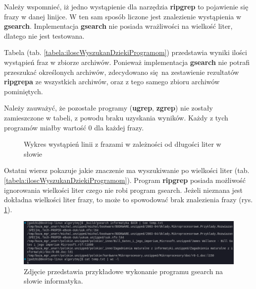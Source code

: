 Należy wspomnieć, iż jedno wystąpienie dla narzędzia \textbf{ripgrep} to pojawienie się frazy
w danej linijce. W ten sam sposób liczone jest znalezienie wystąpienia w \textbf{gsearch}.
Implementacja \textbf{gsearch} nie posiada wrażliwości na wielkość liter, dlatego nie 
jest testowana.

Tabela (tab. \ref{tabela:iloscWyszukanDziekiProgramom}) przedstawia wyniki ilości 
wystąpień fraz w zbiorze archiwów. Ponieważ implementacja \textbf{gsearch} nie potrafi
przeszukać określonych archiwów, zdecydowano się na zestawienie rezultatów
\textbf{ripgrepa} ze wszystkich archiwów, oraz z tego samego zbioru archiwów pominiętych. 

Należy zauważyć, że pozostałe programy (\textbf{ugrep}, \textbf{zgrep}) nie 
zostały zamieszczone w tabeli, z powodu braku uzyskania wyników.
Każdy z tych programów miałby wartość 0 dla każdej frazy.

\begin{figure}[htbp]
    \centering
    \caption{Wykres wystąpień linii z frazami w zależności od długości liter w słowie }
    \label{fig:wykresPorównaniaIlosciWystapień}
\end{figure}

Ostatni wiersz pokazuje jakie znaczenie ma wyszukiwanie po wielkości liter 
(tab. \ref{tabela:iloscWyszukanDziekiProgramom}). Program \textbf{ripgrep} posiada 
możliwość ignorowania wielkości liter czego nie robi program gsearch. Jeżeli
nieznana jest dokładna wielkości liter frazy, to może to spowodować brak 
znalezienia frazy (rys. \ref{fig:wykresPorównaniaIlosciWystapień}). 

\begin{figure}[htbp]
    \centering
    \includegraphics[width=\textwidth]{./images/gsearch-result-informatyka.png}
    \caption{Zdjęcie przedstawia przykładowe wykonanie programu gsearch na słowie informatyka.}
    \label{fig:wykonanieProgramuGsearch}
\end{figure}


